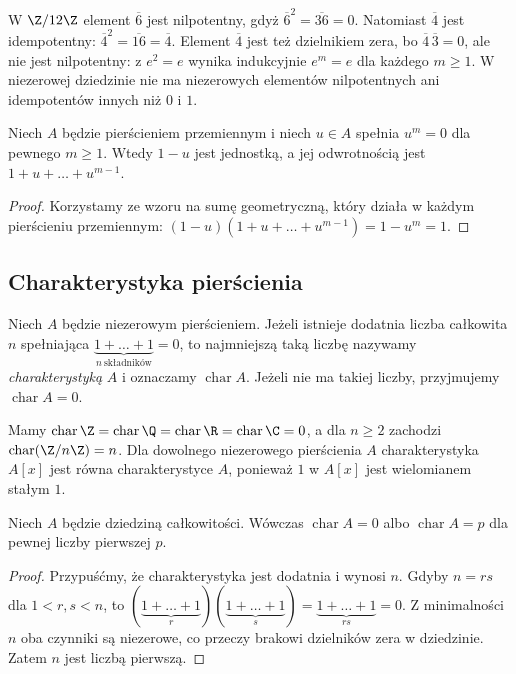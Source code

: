 \begin{przyklad}
W $\Z/12\Z$ element $\overline6$ jest nilpotentny,
gdyż $\overline6^2=\overline{36}=0$.
Natomiast $\overline4$ jest idempotentny:
$\overline4^2=\overline{16}=\overline4$.
Element $\overline4$ jest też dzielnikiem zera, bo
$\overline4\,\overline3=0$, ale nie jest nilpotentny:
z $e^2=e$ wynika indukcyjnie $e^m=e$ dla każdego $m\ge1$.
W niezerowej dziedzinie nie ma niezerowych elementów nilpotentnych
ani idempotentów innych niż $0$ i $1$.
\end{przyklad}

\begin{lemat}
Niech $A$ będzie pierścieniem przemiennym i niech $u\in A$ spełnia
$u^m=0$ dla pewnego $m\ge1$. Wtedy $1-u$ jest jednostką, a jej
odwrotnością jest $1+u+\dots+u^{m-1}$.
\end{lemat}
\begin{proof}
Korzystamy ze wzoru na sumę geometryczną, który działa w każdym
pierścieniu przemiennym:
$(1-u)(1+u+\dots+u^{m-1})=1-u^m=1$.
\end{proof}


\subsection{Charakterystyka pierścienia}

\begin{definicja}[Charakterystyka]
Niech $A$ będzie niezerowym pierścieniem.
Jeżeli istnieje dodatnia liczba całkowita $n$ spełniająca
$\underbrace{1+\dots+1}_{n\ \text{składników}}=0$,
to najmniejszą taką liczbę nazywamy \emph{charakterystyką} $A$
i oznaczamy $\operatorname{char}A$.
Jeżeli nie ma takiej liczby, przyjmujemy $\operatorname{char}A=0$.
\end{definicja}

\begin{przyklad}
Mamy $\operatorname{char}\Z=\operatorname{char}\Q
=\operatorname{char}\R=\operatorname{char}\C=0$,
a dla $n\ge2$ zachodzi $\operatorname{char}(\Z/n\Z)=n$.
Dla dowolnego niezerowego pierścienia $A$ charakterystyka $A[x]$ jest równa
charakterystyce $A$, ponieważ $1$ w $A[x]$ jest wielomianem stałym $1$.
\end{przyklad}

\begin{stwierdzenie}
Niech $A$ będzie dziedziną całkowitości. Wówczas
$\operatorname{char}A=0$ albo $\operatorname{char}A=p$
dla pewnej liczby pierwszej $p$.
\end{stwierdzenie}
\begin{proof}
Przypuśćmy, że charakterystyka jest dodatnia i wynosi $n$.
Gdyby $n=rs$ dla $1<r,s<n$, to
$(\underbrace{1+\dots+1}_{r})(\underbrace{1+\dots+1}_{s})
=\underbrace{1+\dots+1}_{rs}=0$.
Z minimalności $n$ oba czynniki są niezerowe, co przeczy
brakowi dzielników zera w dziedzinie. Zatem $n$ jest liczbą pierwszą.
\end{proof}

